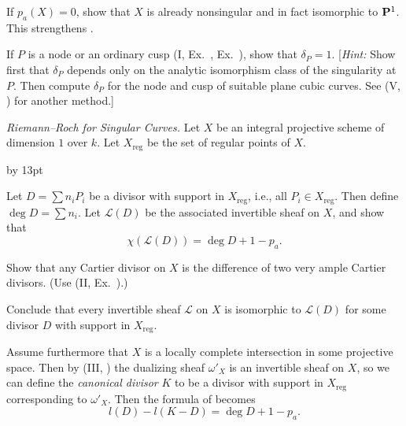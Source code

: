 {{{\noindent\hypertarget{ex-IV-1.8b}{}If $p_a(X)=0$, show that $X$ is already nonsingular and in fact isomorphic to $\mathbf{P}^1$. This strengthens .

\noindent\hypertarget{ex-IV-1.8c}{}If $P$ is a node or an ordinary cusp (I, Ex.~, Ex.~), show that $\delta_P=1$. [\emph{Hint:} Show first that $\delta_P$ depends only on the analytic isomorphism class of the singularity at $P$. Then compute $\delta_P$ for the node and cusp of suitable plane cubic curves. See (V, ) for another method.]\par}

\smallskip
\noindent\hypertarget{ex-IV-1.9}{}\emph{Riemann--Roch for Singular Curves.} Let $X$ be an integral projective scheme of dimension $1$ over $k$. Let $X_{\mathrm{reg}}$ be the set of regular points of $X$.
{\advance\leftskip by 13pt\par
\noindent\hypertarget{ex-IV-1.9a}{}Let $D=\sum n_iP_i$ be a divisor with support in $X_{\mathrm{reg}}$, i.e., all $P_i\in X_{\mathrm{reg}}$. Then define $\deg D=\sum n_i$. Let $\mathcal L(D)$ be the associated invertible sheaf on $X$, and show that
\[
\chi(\mathcal L(D))=\deg D+1-p_a.
\]

\noindent\hypertarget{ex-IV-1.9b}{}Show that any Cartier divisor on $X$ is the difference of two very ample Cartier divisors. (Use (II, Ex.~).)

\noindent\hypertarget{ex-IV-1.9c}{}Conclude that every invertible sheaf $\mathcal L$ on $X$ is isomorphic to $\mathcal L(D)$ for some divisor $D$ with support in $X_{\mathrm{reg}}$.

\noindent\hypertarget{ex-IV-1.9d}{}Assume furthermore that $X$ is a locally complete intersection in some projective space. Then by (III, ) the dualizing sheaf $\omega'_X$ is an invertible sheaf on $X$, so we can define the \emph{canonical divisor} $K$ to be a divisor with support in $X_{\mathrm{reg}}$ corresponding to $\omega'_X$. Then the formula of  becomes
\[
l(D)-l(K-D)=\deg D+1-p_a.
\]\par}\par}
}
